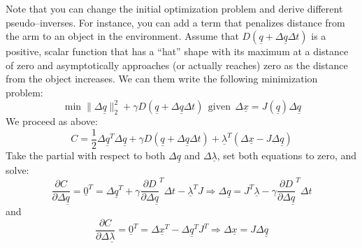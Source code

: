 \documentclass[]{article}
\begin{document}
Note that you can change the initial optimization problem and derive different pseudo--inverses. For instance, you can add a term that penalizes distance from the arm to an object in the environment. Assume that $D(\underline{q} + \Delta\underline{q}\Delta t)$ is a positive, scalar function that has a ``hat'' shape with its maximum at a distance of zero and asymptotically approaches (or actually reaches) zero as the distance from the object increases. We can them write the following minimization problem:
\begin{displaymath}
\min \|\Delta \underline{q}\|_{2}^{2} + \gamma D(\underline{q} + \Delta\underline{q}\Delta t)\ \ \text{given}\ \ 	\Delta \underline{x} = J(\underline{q})\Delta\underline{q}
\end{displaymath}
We proceed as above:
\begin{displaymath}
C = \frac{1}{2} \Delta \underline{q}^{T}\Delta\underline{q} + \gamma D(\underline{q} + \Delta\underline{q}\Delta t)+ \underline{\lambda}^{T}(\Delta\underline{x} - J\Delta\underline{q})
\end{displaymath}
Take the partial with respect to both $\Delta\underline{q}$ and $\Delta\underline{\lambda}$, set both equations to zero, and solve:
\begin{equation}
\frac{\partial C}{\partial \Delta\underline{q}} = \underline{0}^{T} = \Delta\underline{q}^{T} + \gamma \frac{\partial D}{\partial \Delta\underline{q}}^{T}\Delta t - \underline{\lambda}^{T}J \Rightarrow \Delta \underline{q}  = J^{T}\underline{\lambda} - \gamma \frac{\partial D}{\partial \Delta\underline{q}}^{T}\Delta t \label{fourth}
\end{equation}
and
\begin{equation}
	\frac{\partial C}{\partial \Delta\underline{\lambda}} = \underline{0}^{T} = \Delta\underline{x}^{T} - \Delta\underline{q}^{T}J^{T} \Rightarrow \Delta \underline{x} = J \Delta\underline{q} \label{fifth}
\end{equation}
\end{document}
